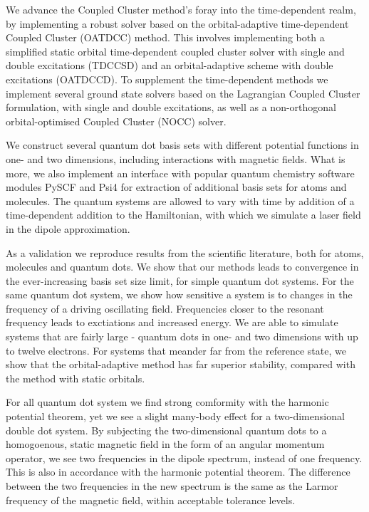 We advance the Coupled Cluster method's foray into the time-dependent realm, 
by implementing a robust solver based on the orbital-adaptive time-dependent 
Coupled Cluster (OATDCC)\cite{kvaal2012ab} method.
This involves implementing both a simplified static
orbital time-dependent coupled cluster solver with single and double excitations 
(TDCCSD) and an orbital-adaptive scheme with double excitations (OATDCCD).
To supplement the time-dependent methods we implement several ground state 
solvers based on the Lagrangian Coupled Cluster formulation, with single and double 
excitations, as well as a non-orthogonal orbital-optimised Coupled Cluster (NOCC)
solver\cite{myhre2018demonstrating}.

We construct several quantum dot basis sets with different potential functions
in one- and two dimensions, including interactions with magnetic fields.
What is more, we also implement an 
interface with popular quantum chemistry software modules PySCF\cite{PYSCF}
and Psi4\cite{parrish2017psi4} for extraction of additional 
basis sets for atoms and molecules. The quantum systems are allowed to vary with time 
by addition of a time-dependent addition to the Hamiltonian, with which we simulate 
a laser field in the dipole approximation.

As a validation we reproduce results from the scientific literature, both for 
atoms, molecules and quantum dots. We show that our methods leads to convergence in 
the ever-increasing basis set size limit, for simple quantum dot systems. For the 
same quantum dot system, we show how sensitive a system is to changes in the frequency
of 
a driving oscillating field. Frequencies closer to the resonant frequency 
leads to exctiations and increased energy. We are able to simulate systems that 
are fairly large - quantum dots in one- and two dimensions with up to twelve 
electrons. For systems that meander far from the reference state, we show that 
the orbital-adaptive method has far superior stability, compared with the 
method with static orbitals.

For all quantum dot system we find 
strong comformity with the harmonic potential theorem\cite{kohn1961cyclotron},
yet we see a slight many-body 
effect for a two-dimensional double dot system. By subjecting the two-dimensional
quantum dots 
to a homogoenous, static magnetic field in the form of an angular 
momentum operator, we see two frequencies in the dipole spectrum, instead of one 
frequency. This
is also in accordance with the harmonic potential theorem.
The difference between the two frequencies in the new spectrum is the same as the
Larmor frequency of the magnetic field, within acceptable tolerance levels. 